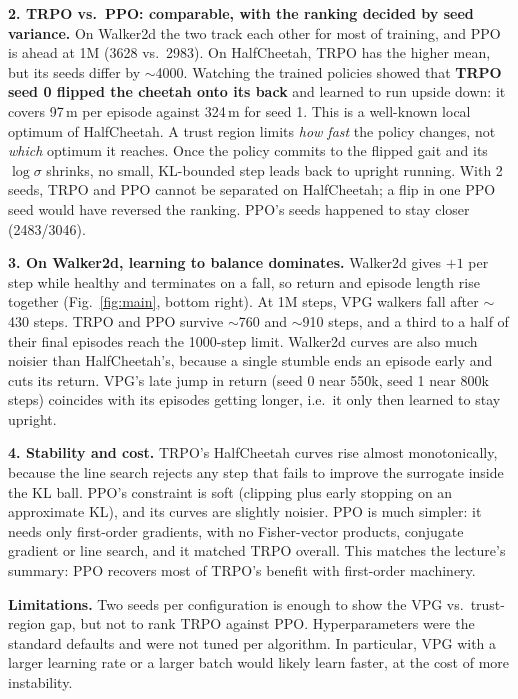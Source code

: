 \documentclass[10pt]{article}
\begin{document}
\textbf{2. TRPO vs.\ PPO: comparable, with the ranking decided by seed variance.}
On Walker2d the two track each other for most of training, and PPO is ahead at 1M (3628 vs.\ 2983).
On HalfCheetah, TRPO has the higher mean, but its seeds differ by $\sim$4000.
Watching the trained policies showed that \textbf{TRPO seed 0 flipped the cheetah onto its back} and learned to run upside down: it covers 97\,m per episode against 324\,m for seed 1.
This is a well-known local optimum of HalfCheetah.
A trust region limits \emph{how fast} the policy changes, not \emph{which} optimum it reaches.
Once the policy commits to the flipped gait and its $\log\sigma$ shrinks, no small, KL-bounded step leads back to upright running.
With 2 seeds, TRPO and PPO cannot be separated on HalfCheetah; a flip in one PPO seed would have reversed the ranking.
PPO's seeds happened to stay closer (2483/3046).

\textbf{3. On Walker2d, learning to balance dominates.}
Walker2d gives $+1$ per step while healthy and terminates on a fall, so return and episode length rise together (Fig.~\ref{fig:main}, bottom right).
At 1M steps, VPG walkers fall after $\sim$430 steps.
TRPO and PPO survive $\sim$760 and $\sim$910 steps, and a third to a half of their final episodes reach the 1000-step limit.
Walker2d curves are also much noisier than HalfCheetah's, because a single stumble ends an episode early and cuts its return.
VPG's late jump in return (seed 0 near 550k, seed 1 near 800k steps) coincides with its episodes getting longer, i.e.\ it only then learned to stay upright.

\textbf{4. Stability and cost.}
TRPO's HalfCheetah curves rise almost monotonically, because the line search rejects any step that fails to improve the surrogate inside the KL ball.
PPO's constraint is soft (clipping plus early stopping on an approximate KL), and its curves are slightly noisier.
PPO is much simpler: it needs only first-order gradients, with no Fisher-vector products, conjugate gradient or line search, and it matched TRPO overall.
This matches the lecture's summary: PPO recovers most of TRPO's benefit with first-order machinery.

\textbf{Limitations.}
Two seeds per configuration is enough to show the VPG vs.\ trust-region gap, but not to rank TRPO against PPO.
Hyperparameters were the standard defaults and were not tuned per algorithm.
In particular, VPG with a larger learning rate or a larger batch would likely learn faster, at the cost of more instability.
\end{document}
